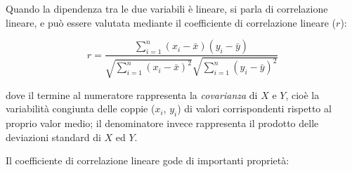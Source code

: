 Quando la dipendenza tra le due variabili è lineare, si parla di correlazione lineare, e può essere valutata mediante il coefficiente di correlazione lineare ($r$):

$$r=\frac{\sum_{i=1}^{n}\left(x_{i}-\bar{x}\right)\left(y_{i}-\bar{y}\right)}{\sqrt{\sum_{i=1}^{n}\left(x_{i}-\bar{x}\right)^{2}} \sqrt{\sum_{i=1}^{n}\left(y_{i}-\bar{y}\right)^{2}}}$$\smallskip

dove il termine al numeratore rappresenta la \textit{covarianza} di $X$ e $Y$, cioè la variabilità congiunta delle coppie ($x_i$, $y_i$) di valori corrispondenti rispetto al proprio valor medio; il denominatore invece rappresenta il prodotto delle deviazioni standard di $X$ ed $Y$.

Il coefficiente di correlazione lineare gode di importanti proprietà:

